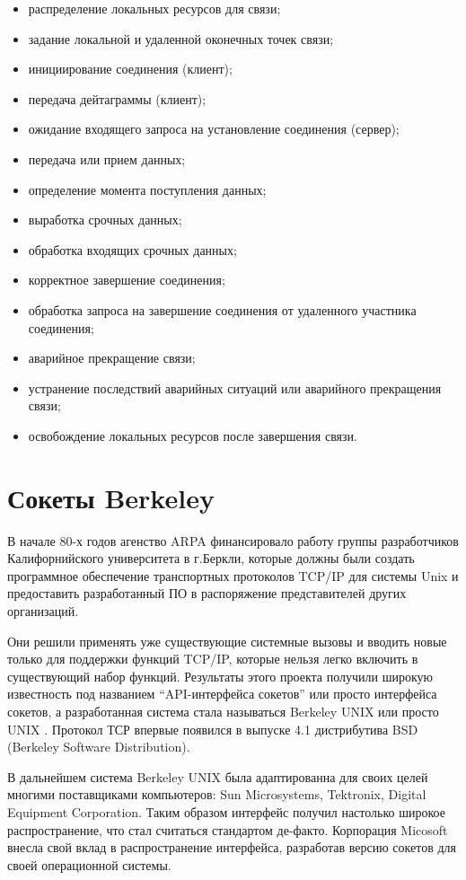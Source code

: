 \begin{itemize}
\item распределение локальных ресурсов для связи;
\item задание локальной и удаленной оконечных точек связи;
\item инициирование соединения (клиент);
\item передача дейтаграммы (клиент);
\item ожидание входящего запроса на установление соединения (сервер);
\item передача или прием данных;
\item определение момента поступления данных;
\item выработка срочных данных;
\item обработка входящих срочных данных;
\item корректное завершение соединения;
\item обработка запроса на завершение соединения от удаленного участника соединения;
\item аварийное прекращение связи;
\item устранение последствий аварийных ситуаций или аварийного прекращения связи;
\item освобождение локальных ресурсов после завершения связи.
\end{itemize}


\section{Сокеты Berkeley}

В начале 80-х годов агенство ARPA финансировало работу группы разработчиков Калифорнийского университета в г.Беркли,  которые должны были создать программное обеспечение транспортных протоколов TCP/IP для системы Unix и предоставить разработанный ПО в распоряжение представителей других организаций.

Они решили применять уже существующие системные вызовы и вводить новые только для поддержки функций TCP/IP,  которые нельзя легко включить в существующий набор функций. Результаты этого проекта получили широкую известность под названием “API-интерфейса сокетов” или просто интерфейса сокетов,  а разработанная система стала называться Berkeley UNIX или просто UNIX . Протокол ТСР впервые появился в выпуске 4.1 дистрибутива BSD (Berkeley Software Distribution).

В дальнейшем система Berkeley UNIX была адаптированна для своих целей многими поставщиками компьютеров: Sun Microsystems,  Tektronix,  Digital Equipment Corporation. Таким образом интерфейс получил настолько широкое распространение,  что стал считаться стандартом де-факто. Корпорация Micosoft внесла свой вклад в распространение интерфейса,  разработав версию сокетов для своей операционной системы.

